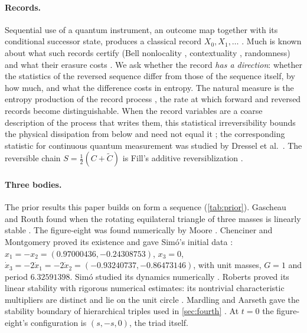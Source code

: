 \documentclass[11pt]{article}
\theoremstyle{definition}\newtheorem{definition}[theorem]{Definition}
\theoremstyle{remark}\newtheorem{remark}[theorem]{Remark}
\begin{document}
\paragraph{Records.} Sequential use of a quantum instrument, an outcome map together with its conditional successor state, produces a classical record $X_0,X_1,\dots$ \cite{Kraus,Singh}. Much is known about what such records certify (Bell nonlocality \cite{Bell}, contextuality \cite{KS}, randomness) and what their erasure costs \cite{Landauer,ReebWolf,delRio}. We ask whether the record \emph{has a direction}: whether the statistics of the reversed sequence differ from those of the sequence itself, by how much, and what the difference costs in entropy. The natural measure is the entropy production of the record process \cite{Schnakenberg,Gaspard,GaspardErr}, the rate at which forward and reversed records become distinguishable. When the record variables are a coarse description of the process that writes them, this statistical irreversibility bounds the physical dissipation from below and need not equal it \cite{KPV,RoldanParrondo}; the corresponding statistic for continuous quantum measurement was studied by Dressel et al.\ \cite{Dressel}. The reversible chain $S=\frac12(C+\tilde C)$ is Fill's additive reversiblization \cite{Fill}.

\paragraph{Three bodies.} The prior results this paper builds on form a sequence (\cref{tab:prior}). Gascheau and Routh found when the rotating equilateral triangle of three masses is linearly stable \cite{Gascheau,Routh}. The figure-eight was found numerically by Moore \cite{Moore}. Chenciner and Montgomery proved its existence and gave Sim\'o's initial data \cite{CM}: $x_1=-x_2=(0.97000436,-0.24308753)$, $x_3=0$, $\dot x_3=-2\dot x_1=-2\dot x_2=(-0.93240737,-0.86473146)$, with unit masses, $G=1$ and period $6.32591398$. Sim\'o studied its dynamics numerically \cite{Simo}. Roberts proved its linear stability with rigorous numerical estimates: its nontrivial characteristic multipliers are distinct and lie on the unit circle \cite{Roberts}. Mardling and Aarseth gave the stability boundary of hierarchical triples used in \cref{sec:fourth} \cite{MA}. At $t=0$ the figure-eight's configuration is $(s,-s,0)$, the triad itself.
\end{document}

